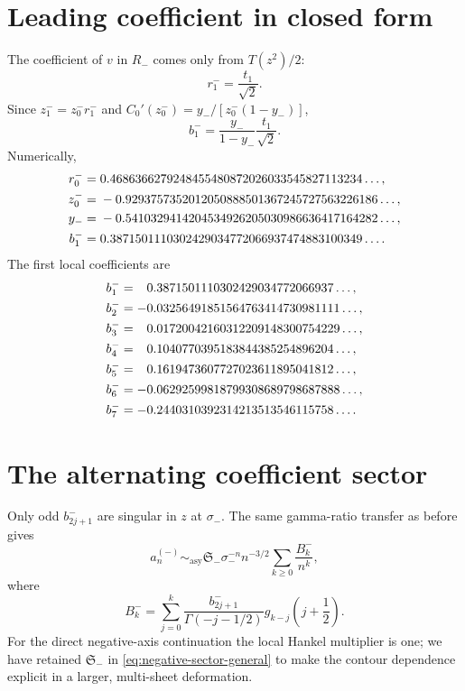 \documentclass[11pt,a4paper,oneside,openany]{book}
\theoremstyle{definition}
\theoremstyle{remark}
\newcommand{\asympseries}{\sim_{\!\mathrm{asy}}}
\newcommand{\Stokes}{\mathfrak S}
\begin{document}
\section{Leading coefficient in closed form}
The coefficient of $v$ in $R_-$ comes only from $T(z^2)/2$:
\begin{equation}
 r_1^-=\frac{t_1}{\sqrt2}.
 \label{eq:rminus1}
\end{equation}
Since $z_1^-=z_0^-r_1^-$ and
$C_0'(z_0^-)=y_-/[z_0^-(1-y_-)]$,
\begin{equation}
 \boxed{
 b_1^-=\frac{y_-}{1-y_-}\frac{t_1}{\sqrt2}.}
 \label{eq:bminus1-closed}
\end{equation}
Numerically,
\begin{align}
 r_0^-={}&0.4686366279248455480872026033545827113234\ldots,\notag\\
 z_0^-={}&-0.9293757352012050888501367245727563226186\ldots,\notag\\
 y_-={}&-0.5410329414204534926205030986636417164282\ldots,\notag\\
 b_1^-={}&0.3871501110302429034772066937474883100349\ldots.
 \label{eq:minus-leading-numeric}
\end{align}
The first local coefficients are
\begin{align}
 b_1^-&= \phantom{-}0.3871501110302429034772066937\ldots,\notag\\
 b_2^-&=-0.03256491851564763414730981111\ldots,\notag\\
 b_3^-&= \phantom{-}0.01720042160312209148300754229\ldots,\notag\\
 b_4^-&= \phantom{-}0.1040770395183844385254896204\ldots,\notag\\
 b_5^-&= \phantom{-}0.1619473607727023611895041812\ldots,\notag\\
 b_6^-&=-0.06292599818799308689798687888\ldots,\notag\\
 b_7^-&=-0.2440310392314213513546115758\ldots.
 \label{eq:bminus-numeric}
\end{align}

\section{The alternating coefficient sector}
Only odd $b_{2j+1}^-$ are singular in $z$ at $\sigma_-$.  The same gamma-ratio
transfer as before gives
\begin{equation}
 a_n^{(-)}\asympseries
 \Stokes_-\sigma_-^{-n}n^{-3/2}
 \sum_{k\ge0}\frac{B_k^-}{n^k},
 \label{eq:negative-sector-general}
\end{equation}
where
\begin{equation}
 \boxed{
 B_k^-=\sum_{j=0}^{k}
 \frac{b_{2j+1}^-}{\Gamma(-j-1/2)}
 g_{k-j}\!\left(j+\frac12\right).}
 \label{eq:Bminus-master}
\end{equation}
For the direct negative-axis continuation the local Hankel multiplier is one;
we have retained $\Stokes_-$ in \cref{eq:negative-sector-general} to make the
contour dependence explicit in a larger, multi-sheet deformation.
\end{document}
